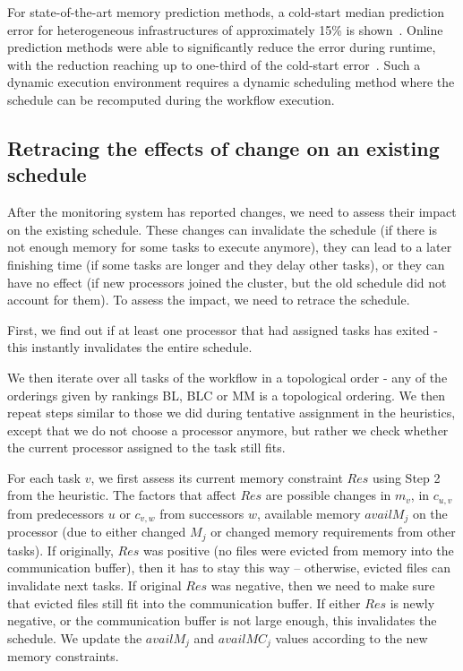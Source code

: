 \documentclass[conference]{IEEEtran}
\begin{document}
    For state-of-the-art memory prediction methods, a cold-start median prediction error for heterogeneous infrastructures
    of approximately 15\% is shown~\cite{malik2013execution}.
    Online prediction methods were able to significantly reduce the error during runtime, with the reduction reaching up to one-third of the cold-start error~\cite{baderDiedrichDynamic2023,witt2019learning}.
    Such a dynamic execution environment requires a dynamic scheduling method where the schedule can be recomputed during the workflow execution.

    \subsection*{Retracing the effects of change on an existing schedule}
    After the monitoring system has reported changes, we need to assess their impact on the existing schedule.
    These changes can invalidate the schedule (\eg if there is not enough memory for some tasks to execute anymore),
    they can lead to a later finishing time (\eg if some tasks are longer and they delay other tasks), or they can have no effect (\eg if new processors
    joined the cluster, but the old schedule did not account for them).
    To assess the impact, we need to retrace the schedule.

    First, we find out if at least one processor that had assigned tasks has exited - this instantly invalidates the
    entire schedule.

    We then iterate over all tasks of the workflow in a topological order - any of the orderings given by rankings BL, BLC or MM
    is a topological ordering.
    We then repeat steps similar to those we did during tentative assignment in the heuristics, 
    except that we do not choose a processor
    anymore, but rather we check whether the current processor assigned to the task still fits.

    For each task $v$, we first assess its current memory constraint $Res$ using Step 2 from the heuristic.
    The factors that affect $Res$ are possible changes in $m_v$, in $c_{u,v}$ from predecessors $u$ 
    or $c_{v,w}$ from successors $w$,
    available memory $availM_j$ on the processor (due to either changed $M_j$ or changed memory requirements 
    from other tasks).
    If originally, $Res$ was positive (no files were evicted from memory into the communication buffer), 
    then it has to stay this way --
    otherwise, evicted files can invalidate next tasks.
    If original $Res$ was negative, then we need to make sure that evicted files still fit into the communication buffer.
    If either $Res$ is newly negative, or the communication buffer is not large enough, this invalidates the schedule.
    We update the $availM_j$ and $availMC_j$ values according to the new memory constraints.
\end{document}
